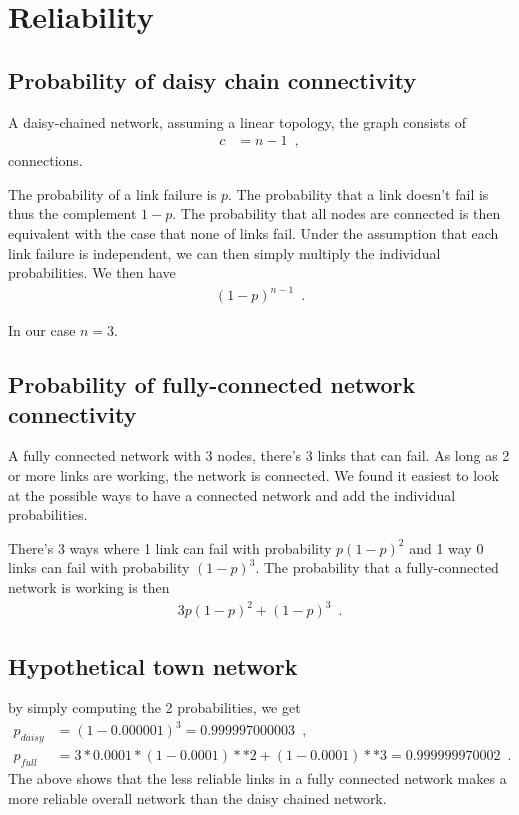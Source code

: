 
\section{Reliability}

\subsection{Probability of daisy chain connectivity}
A daisy-chained network, assuming a linear topology, the graph consists of
\begin{align}
    c &= n - 1 \enspace ,
\end{align}
connections.

The probability of a link failure is $p$. The probability that a link doesn't
fail is thus the complement $1 - p$. The probability that all nodes are connected
is then equivalent with the case that none of links fail. Under the assumption
that each link failure is independent, we can then simply multiply the individual
probabilities. We then have
\begin{align}
    (1 - p)^{n-1} \enspace .
\end{align}

In our case $n = 3$.

\subsection{Probability of fully-connected network connectivity}
A fully connected network with 3 nodes, there's 3 links that can fail. As long
as 2 or more links are working, the network is connected. We found it easiest
to look at the possible ways to have a connected network and add the
individual probabilities.

There's 3 ways where 1 link can fail with probability $p(1-p)^2$ and 1 way
0 links can fail with probability $(1-p)^3$. The probability that a
fully-connected network is working is then
\begin{align*}
3p(1-p)^2 + (1-p)^3 \enspace .
\end{align*}

\subsection{Hypothetical town network}

by simply computing the 2 probabilities, we get
\begin{align*}
p_{daisy} &= (1-0.000001)^3 = 0.999997000003\enspace , \\
p_{full} &= 3*0.0001*(1-0.0001)**2+(1-0.0001)**3 = 0.999999970002 \enspace .
\end{align*}
The above shows that the less reliable links in a fully connected network
makes a more reliable overall network than the daisy chained network.

